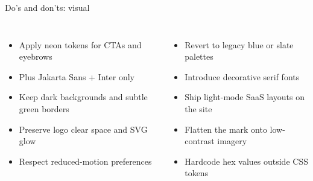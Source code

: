 \documentclass[aspectratio=169,10pt]{beamer}
\begin{document}
\begin{frame}{Do's and don'ts: visual}
  \begin{columns}[T,onlytextwidth]
    \vspace{0.4em}
    \begin{itemize}
      \item Apply neon tokens for CTAs and eyebrows
      \item Plus Jakarta Sans + Inter only
      \item Keep dark backgrounds and subtle green borders
      \item Preserve logo clear space and SVG glow
      \item Respect reduced-motion preferences
    \end{itemize}

    \vspace{0.4em}
    \begin{itemize}
      \item Revert to legacy blue or slate palettes
      \item Introduce decorative serif fonts
      \item Ship light-mode SaaS layouts on the site
      \item Flatten the mark onto low-contrast imagery
      \item Hardcode hex values outside CSS tokens
    \end{itemize}
  \end{columns}
\end{frame}
\end{document}
